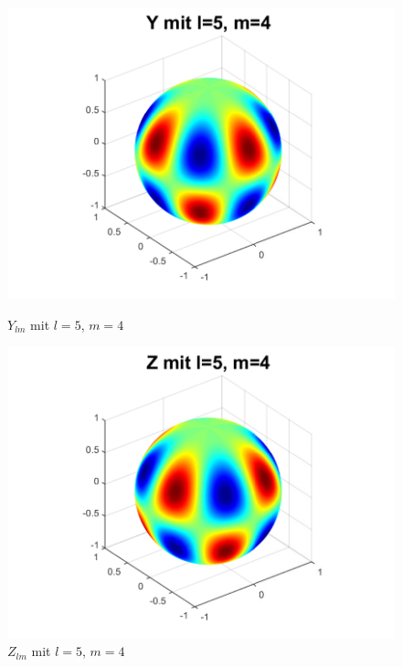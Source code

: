 \begin{refsection}
\begin{figure}
\begin{minipage}[hbt]{0.4\textwidth}
\includegraphics[width=1\textwidth]{kugel/ylm/a_5_4.pdf}
\caption{$Y_{lm}$ mit $l=5$, $m=4$}
\label{skript:ylm l=5 m=4}
\end{minipage}
\hfill
\begin{minipage}[hbt]{0.4\textwidth}
\centering
\includegraphics[width=1\textwidth]{kugel/ylm/b_5_4.pdf}
\caption{$Z_{lm}$ mit $l=5$, $m=4$}
\label{skript:zlm l=5 m=4}
\end{minipage}
\begin{minipage}[hbt]{0.4\textwidth}
\centering

\end{minipage}
\end{figure}
\end{refsection}
